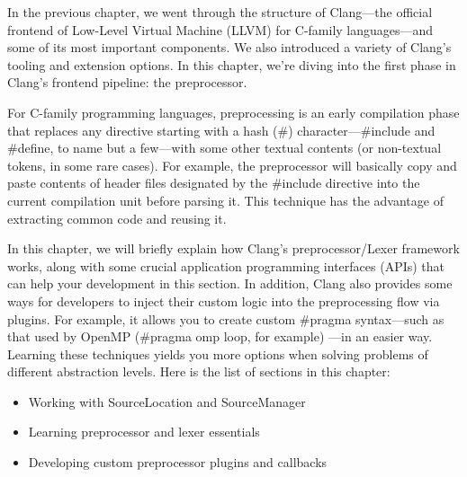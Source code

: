 In the previous chapter, we went through the structure of Clang—the official frontend of Low-Level Virtual Machine (LLVM) for C-family languages—and some of its most important components. We also introduced a variety of Clang's tooling and extension options. In this chapter, we're diving into the first phase in Clang's frontend pipeline: the preprocessor.

For C-family programming languages, preprocessing is an early compilation phase that replaces any directive starting with a hash (\#) character—\#include and \#define, to name but a few—with some other textual contents (or non-textual tokens, in some rare cases). For example, the preprocessor will basically copy and paste contents of header files designated by the \#include directive into the current compilation unit before parsing it. This technique has the advantage of extracting common code and reusing it.

In this chapter, we will briefly explain how Clang's preprocessor/Lexer framework works, along with some crucial application programming interfaces (APIs) that can help your development in this section. In addition, Clang also provides some ways for developers to inject their custom logic into the preprocessing flow via plugins. For example, it allows you to create custom \#pragma syntax—such as that used by OpenMP (\#pragma omp loop, for example) —in an easier way. Learning these techniques yields you more options when solving problems of different abstraction levels. Here is the list of sections in this chapter:

\begin{itemize}
\item Working with SourceLocation and SourceManager
\item Learning preprocessor and lexer essentials
\item Developing custom preprocessor plugins and callbacks
\end{itemize}

















